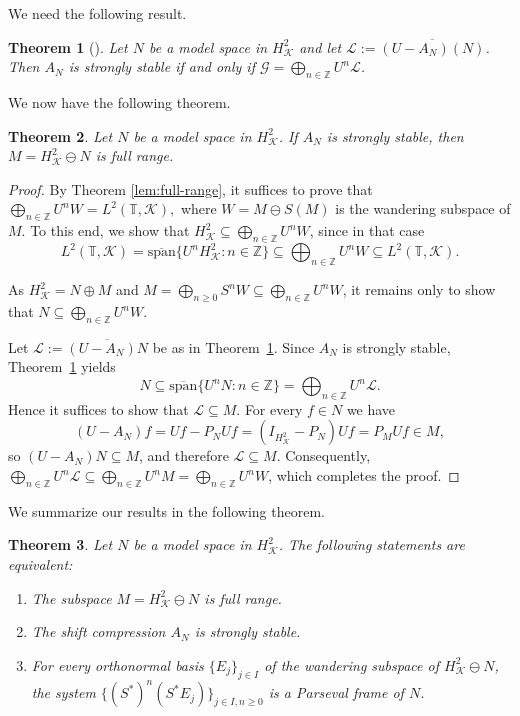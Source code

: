 \documentclass[a4paper,12pt]{amsart}
\def\KK{{\mathcal{K}}}
\def\T{{\mathbb{T}}}
\def\Z{{\mathbb{Z}}}
\def\osp{{\overline{\textrm{span}}}}
\newtheorem{theorem}{Theorem}[section]
\theoremstyle{definition}
\begin{document}
We need the following result.

\begin{theorem}[{\cite[II, Theorem 1.2]{NFBK10}}]\label{nagy} Let $N$ be a model space in $H^{2}_\KK$ and
let $\mathcal{L}:=\overline{(U-A_N)(N)}$. Then $A_N$ is strongly stable if and only if $\mathcal{G}=\bigoplus_{n\in\Z}U^n\mathcal{L}$.
\end{theorem}

We now have the following theorem.

\begin{theorem}\label{Woplus}
Let $N$ be a model space in $H^{2}_\KK$. If $A_N$ is strongly stable, then $M=H^{2}_{\KK}\ominus N$ is full range.
\end{theorem}
\begin{proof}

By Theorem \ref{lem:full-range}, it suffices to prove that 
$\bigoplus_{n\in\Z}U^nW = L^2(\T,\KK),$ where $W=M\ominus S(M)$ is the wandering subspace of $M$. To this end, we show that $H^2_\KK\subseteq\bigoplus_{n\in\Z}U^nW$, since in that case
\begin{equation*}
L^2(\T,\KK)=\osp\{U^nH^2_\KK:n\in\Z\}\subseteq\bigoplus_{n\in\Z}U^nW\subseteq L^2(\T,\KK).
\end{equation*}

As $H^2_{\KK} = N\oplus M$ and $M = \bigoplus_{n\geqslant0}S^nW \subseteq \bigoplus_{n\in\Z}U^nW$,
it remains only to show that $N\subseteq\bigoplus_{n\in\Z}U^nW$.

Let $\mathcal{L}:=\overline{(U-A_N)N}$ be as in Theorem~\ref{nagy}.
Since $A_N$ is strongly stable, Theorem~\ref{nagy} yields
\begin{equation*}
N\subseteq\osp\{U^nN:n\in\Z\}=\bigoplus_{n\in\Z}U^n\mathcal{L}.
\end{equation*}
Hence it suffices to show that $\mathcal{L}\subseteq M$.
For every $f\in N$ we have
\begin{equation*}
(U-A_N)f = Uf - P_NUf = (I_{H^2_\KK}-P_N)Uf = P_MUf\in M,
\end{equation*}
so $(U-A_N)N\subseteq M$, and therefore $\mathcal{L}\subseteq M$.
Consequently, $\bigoplus_{n\in\Z}U^n\mathcal{L}\subseteq\bigoplus_{n\in\Z}U^nM=\bigoplus_{n\in\Z}U^nW$,
which completes the proof.
\end{proof}
We summarize our results in the following theorem.

\begin{theorem}\label{existence}
Let $N$ be a model space in $H^{2}_\KK$. The following statements are equivalent:
\begin{enumerate}[label=(\roman*),ref=(\roman*)]
\item The subspace $M=H^{2}_{\KK}\ominus N$ is full range.
\item The shift compression $A_{N}$ is strongly stable.
\item For every orthonormal basis $\{E_j\}_{j\in I}$ of the wandering subspace of $H^2_{\KK}\ominus N$, the system $\{(S^*)^n (S^*E_j)\}_{j\in I,n\geqslant0 }$ is a Parseval frame of $N$.
\end{enumerate}

\end{theorem}
\end{document}
